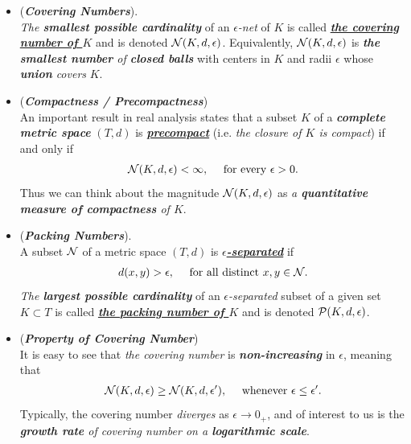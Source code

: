 \documentclass[11pt]{article}
\begin{document}
\begin{itemize}
\item \begin{definition} (\textbf{\emph{Covering Numbers}}). \citep{vershynin2018high} \\
\emph{The \textbf{smallest possible cardinality}} of an \emph{$\epsilon$-net} of $K$ is called  \underline{\textbf{\emph{the covering number of $K$}}} and is denoted ${\mathcal N}(K, d, \epsilon)$. Equivalently, ${\mathcal N}(K, d, \epsilon)$ is \emph{\textbf{the smallest number} of \textbf{closed balls}} with centers in $K$ and radii $\epsilon$ whose \textbf{\emph{union}} \emph{covers} $K$.
\end{definition}

\item \begin{remark}(\emph{\textbf{Compactness / Precompactness}})\\
An important result in real analysis states that a subset $K$ of a \emph{\textbf{complete metric space}} $(T, d)$ is \underline{\emph{\textbf{precompact}}} (i.e. \emph{the closure of $K$ is compact}) if and only if
\begin{align*}
{\mathcal N}(K, d, \epsilon) < \infty, \quad \text{ for every }\epsilon > 0.
\end{align*}
Thus we can think about the magnitude ${\mathcal N}(K, d, \epsilon)$ as \emph{a  \textbf{quantitative measure of compactness} of $K$}.
\end{remark}

\item \begin{definition} (\emph{\textbf{Packing Numbers}}). \citep{vershynin2018high} \\
A subset ${\mathcal N}$ of a metric space $(T, d)$ is \underline{\emph{\textbf{$\epsilon$-separated}}} if 
\begin{align*}
d(x, y) > \epsilon, \quad \text{ for all distinct }x, y \in {\mathcal N}.
\end{align*}
\emph{The \textbf{largest possible cardinality}} of an \emph{$\epsilon$-separated} subset of a given set $K \subset T$ is called  \underline{\emph{\textbf{the packing
number of $K$}}} and is denoted ${\mathcal P}(K, d,  \epsilon)$.
\end{definition}

\item \begin{remark}(\textbf{\emph{Property of Covering Number}})\\
It is easy to see that \emph{the covering number} is \emph{\textbf{non-increasing}} in $\epsilon$, meaning that 
\begin{align*}
{\mathcal N}(K, d, \epsilon) \ge {\mathcal N}(K, d, \epsilon'), \quad \text{ whenever } \epsilon \le \epsilon'.
\end{align*} Typically, the covering number \emph{diverges} as $\epsilon \to 0_{+}$, and of interest to us is the
\emph{\textbf{growth rate} of covering number on a \textbf{logarithmic scale}}.
\end{remark}


\end{itemize}
\end{document}
